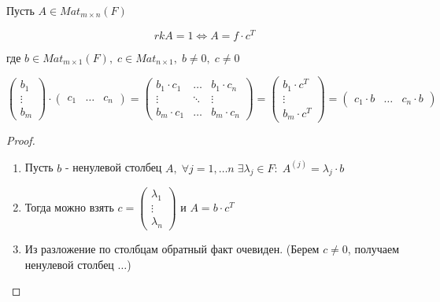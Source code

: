 \begin{lemma}
    
    Пусть $A \in Mat_{m \times n}(F)$

    $$rk A = 1 \Leftrightarrow A = f \cdot c^T$$

    где $b \in Mat_{m \times 1}(F), \; c \in Mat_{n \times 1}, \; b \not= 0, \; c \not= 0$

    $$\begin{pmatrix}
        b_1 \\ \vdots \\ b_m
    \end{pmatrix} \cdot \begin{pmatrix}
        c_1 & \dots & c_n
    \end{pmatrix} = \begin{pmatrix}
        b_1 \cdot c_1 & \dots & b_1 \cdot c_n \\
        \vdots & \ddots & \vdots \\
        b_m \cdot c_1 & \dots & b_m \cdot c_n
    \end{pmatrix} = \begin{pmatrix}
        b_1 \cdot c^T \\ \vdots \\ b_m \cdot c^T
    \end{pmatrix} = \begin{pmatrix}
        c_1 \cdot b & \dots & c_n \cdot b
    \end{pmatrix}$$

    \begin{proof}~

        \begin{enumerate}
            \item Пусть $b$ - ненулевой столбец $A, \; \forall j = 1, \dots n \; \exists \lambda_j \in F: \; A^{(j)} = \lambda_j \cdot b$
            \item Тогда можно взять $c = \begin{pmatrix}
                \lambda_1 \\ \vdots \\ \lambda_n
            \end{pmatrix}$ и $A = b \cdot c^T$
            \item Из разложение по столбцам обратный факт очевиден. (Берем $c \not= 0$, получаем ненулевой столбец $\dots$)
        \end{enumerate}
        
    \end{proof}

\end{lemma}


